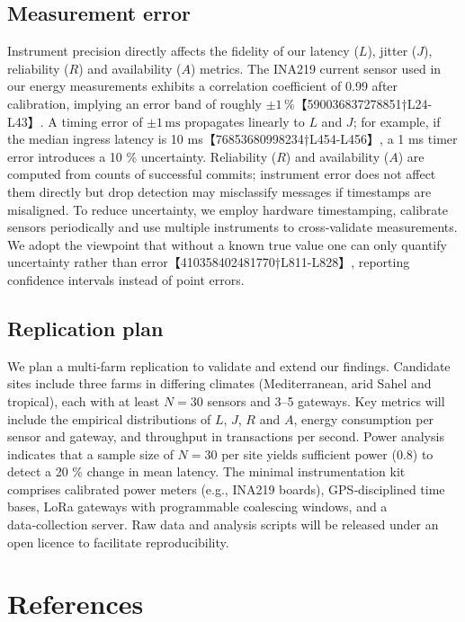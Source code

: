 \documentclass[12pt,onecolumn]{IEEEtran} %
\begin{document}
\subsection{Measurement error}
Instrument precision directly affects the fidelity of our latency ($L$), jitter ($J$), reliability ($R$) and availability ($A$) metrics.  The INA219 current sensor used in our energy measurements exhibits a correlation coefficient of 0.99 after calibration, implying an error band of roughly \(\pm1\,\%\)【590036837278851†L24-L43】.  A timing error of \(\pm1\,\text{ms}\) propagates linearly to $L$ and $J$; for example, if the median ingress latency is 10 ms【76853680998234†L454-L456】, a 1 ms timer error introduces a 10 \% uncertainty.  Reliability ($R$) and availability ($A$) are computed from counts of successful commits; instrument error does not affect them directly but drop detection may misclassify messages if timestamps are misaligned.  To reduce uncertainty, we employ hardware timestamping, calibrate sensors periodically and use multiple instruments to cross‑validate measurements.  We adopt the viewpoint that without a known true value one can only quantify uncertainty rather than error【410358402481770†L811-L828】, reporting confidence intervals instead of point errors.

\subsection{Replication plan}
We plan a multi‑farm replication to validate and extend our findings.  Candidate sites include three farms in differing climates (Mediterranean, arid Sahel and tropical), each with at least \(N=30\) sensors and 3--5 gateways.  Key metrics will include the empirical distributions of $L$, $J$, $R$ and $A$, energy consumption per sensor and gateway, and throughput in transactions per second.  Power analysis indicates that a sample size of \(N=30\) per site yields sufficient power (0.8) to detect a 20 \% change in mean latency.  The minimal instrumentation kit comprises calibrated power meters (e.g., INA219 boards), GPS‑disciplined time bases, LoRa gateways with programmable coalescing windows, and a data‑collection server.  Raw data and analysis scripts will be released under an open licence to facilitate reproducibility.

\section{References}\label{sec:references}
% 

\clearpage

\end{document}
